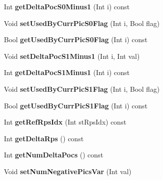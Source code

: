 \begin{DoxyCompactItemize}
Int {\bfseries get\+Delta\+Poc\+S0\+Minus1} (Int i) const
\item 
\mbox{\label{class_t_com_st_ref_pic_set_a230529a9657aa1d92aae9363efa18434}} 
Void {\bfseries set\+Used\+By\+Curr\+Pic\+S0\+Flag} (Int i, Bool flag)
\item 
\mbox{\label{class_t_com_st_ref_pic_set_ae473904e2e31b0c760e2ab34c3f46f92}} 
Bool {\bfseries get\+Used\+By\+Curr\+Pic\+S0\+Flag} (Int i) const
\item 
\mbox{\label{class_t_com_st_ref_pic_set_a8d7fca33d2f0b052ce4d30c0a8cf9f4b}} 
Void {\bfseries set\+Delta\+Poc\+S1\+Minus1} (Int i, Int val)
\item 
\mbox{\label{class_t_com_st_ref_pic_set_a01c61556da07e8d6f363942f90326030}} 
Int {\bfseries get\+Delta\+Poc\+S1\+Minus1} (Int i) const
\item 
\mbox{\label{class_t_com_st_ref_pic_set_a7ea3519db6393afbe40e32fdd8c97504}} 
Void {\bfseries set\+Used\+By\+Curr\+Pic\+S1\+Flag} (Int i, Bool flag)
\item 
\mbox{\label{class_t_com_st_ref_pic_set_afc3ca091c1c9bcb6975d35dd45e724fe}} 
Bool {\bfseries get\+Used\+By\+Curr\+Pic\+S1\+Flag} (Int i) const
\item 
\mbox{\label{class_t_com_st_ref_pic_set_ac1fd33f46dcbd007ba9d82e23abbbdef}} 
Int {\bfseries get\+Ref\+Rps\+Idx} (Int st\+Rps\+Idx) const
\item 
\mbox{\label{class_t_com_st_ref_pic_set_ae40cfc10990eb5584d18d2675539f4e8}} 
Int {\bfseries get\+Delta\+Rps} () const
\item 
\mbox{\label{class_t_com_st_ref_pic_set_ad705a237222150b1881edb5c7faf4d5c}} 
Int {\bfseries get\+Num\+Delta\+Pocs} () const
\item 
\mbox{\label{class_t_com_st_ref_pic_set_a0881291ce12e2ac5b7b6dd8fc515cead}} 
Void {\bfseries set\+Num\+Negative\+Pics\+Var} (Int val)

\end{DoxyCompactItemize}
